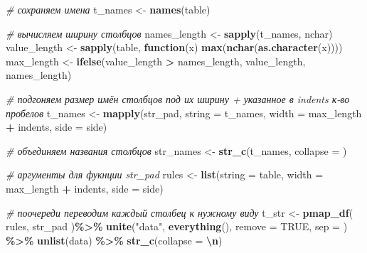 \documentclass[
]{book}
\newenvironment{Shaded}{\begin{snugshade}}{\end{snugshade}}
\newcommand{\AttributeTok}[1]{\textcolor[rgb]{0.13,0.29,0.53}{#1}}
\newcommand{\CommentTok}[1]{\textcolor[rgb]{0.56,0.35,0.01}{\textit{#1}}}
\newcommand{\ConstantTok}[1]{\textcolor[rgb]{0.56,0.35,0.01}{#1}}
\newcommand{\ControlFlowTok}[1]{\textcolor[rgb]{0.13,0.29,0.53}{\textbf{#1}}}
\newcommand{\FunctionTok}[1]{\textcolor[rgb]{0.13,0.29,0.53}{\textbf{#1}}}
\newcommand{\NormalTok}[1]{#1}
\newcommand{\OtherTok}[1]{\textcolor[rgb]{0.56,0.35,0.01}{#1}}
\newcommand{\SpecialCharTok}[1]{\textcolor[rgb]{0.81,0.36,0.00}{\textbf{#1}}}
\newcommand{\StringTok}[1]{\textcolor[rgb]{0.31,0.60,0.02}{#1}}
\begin{document}
\begin{Shaded}
\begin{Highlighting}[]
  \CommentTok{\# сохраняем имена}
\NormalTok{  t\_names      }\OtherTok{\textless{}{-}} \FunctionTok{names}\NormalTok{(table)}

  \CommentTok{\# вычисляем ширину столбцов}
\NormalTok{  names\_length }\OtherTok{\textless{}{-}} \FunctionTok{sapply}\NormalTok{(t\_names, nchar) }
\NormalTok{  value\_length }\OtherTok{\textless{}{-}} \FunctionTok{sapply}\NormalTok{(table, }\ControlFlowTok{function}\NormalTok{(x) }\FunctionTok{max}\NormalTok{(}\FunctionTok{nchar}\NormalTok{(}\FunctionTok{as.character}\NormalTok{(x))))}
\NormalTok{  max\_length   }\OtherTok{\textless{}{-}} \FunctionTok{ifelse}\NormalTok{(value\_length }\SpecialCharTok{\textgreater{}}\NormalTok{ names\_length, value\_length, names\_length)}
  
  \CommentTok{\# подгоняем размер имён столбцов под их ширину + указанное в indents к{-}во пробелов }
\NormalTok{  t\_names }\OtherTok{\textless{}{-}} \FunctionTok{mapply}\NormalTok{(str\_pad, }
                    \AttributeTok{string =}\NormalTok{ t\_names, }
                    \AttributeTok{width  =}\NormalTok{ max\_length }\SpecialCharTok{+}\NormalTok{ indents, }
                    \AttributeTok{side   =}\NormalTok{ side)}
  
  \CommentTok{\# объединяем названия столбцов}
\NormalTok{  str\_names }\OtherTok{\textless{}{-}} \FunctionTok{str\_c}\NormalTok{(t\_names, }\AttributeTok{collapse =} \StringTok{\textquotesingle{}\textquotesingle{}}\NormalTok{)}
  
  \CommentTok{\# аргументы для фукнции str\_pad}
\NormalTok{  rules }\OtherTok{\textless{}{-}} \FunctionTok{list}\NormalTok{(}\AttributeTok{string =}\NormalTok{ table, }\AttributeTok{width =}\NormalTok{ max\_length }\SpecialCharTok{+}\NormalTok{ indents, }\AttributeTok{side =}\NormalTok{ side)}

  \CommentTok{\# поочереди переводим каждый столбец к нужному виду}
\NormalTok{  t\_str }\OtherTok{\textless{}{-}}   \FunctionTok{pmap\_df}\NormalTok{( rules, str\_pad )}\SpecialCharTok{\%\textgreater{}\%}
              \FunctionTok{unite}\NormalTok{(}\StringTok{"data"}\NormalTok{, }\FunctionTok{everything}\NormalTok{(), }\AttributeTok{remove =} \ConstantTok{TRUE}\NormalTok{, }\AttributeTok{sep =} \StringTok{\textquotesingle{}\textquotesingle{}}\NormalTok{) }\SpecialCharTok{\%\textgreater{}\%}
              \FunctionTok{unlist}\NormalTok{(data) }\SpecialCharTok{\%\textgreater{}\%}
              \FunctionTok{str\_c}\NormalTok{(}\AttributeTok{collapse =} \StringTok{\textquotesingle{}}\SpecialCharTok{\textbackslash{}n}\StringTok{\textquotesingle{}}\NormalTok{) }
  

\end{Highlighting}
\end{Shaded}
\end{document}
